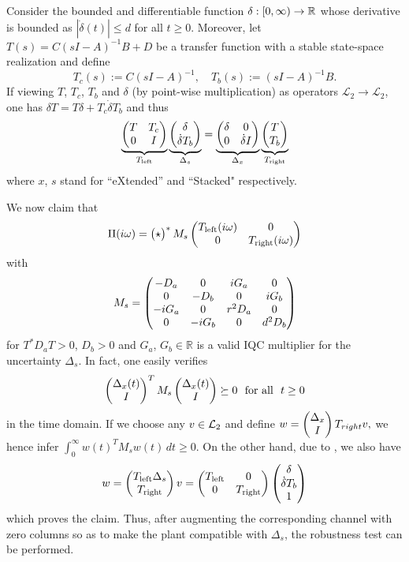 \begin{lem}\label{lem:swap}
Consider the bounded and differentiable function $\delta:[0,\infty)\to\mathbb{R}$ whose derivative is 
bounded as $|\dot{\delta}(t)| \leq d$ for all $t\geq 0$. Moreover, let $T(s) = C(sI-A)^{-1}B+D$ 
be a transfer function with a stable state-space realization and define
\begin{equation*}
T_c(s) :=  C(sI-A)^{-1}, \quad T_b(s) :=  (sI-A)^{-1}B.
\end{equation*}
If viewing $T$, $T_c$, $T_b$ and $\delta$ (by point-wise multiplication) as operators
$\mathcal{L}_2\to \mathcal{L}_2$, one has $\delta T = T\delta  + T_c \dot{\delta} T_b $ and thus
\begin{equation*}
\underbrace{\begin{pmatrix}T &T_c\\0 &I\end{pmatrix}}_{T_{\mathrm{left}}}\underbrace{
\begin{pmatrix}\delta\\ \dot{\delta}T_b\end{pmatrix}}_{\Delta_s} = \underbrace{\begin{pmatrix}\delta &0\\0 & \dot{\delta}I\end{pmatrix}}_{\Delta_x} 
\underbrace{\begin{pmatrix}T\\T_b\end{pmatrix}}_{T_{\mathrm{right}}}
\end{equation*}
where $x$, $s$ stand for ``eXtended'' and ``Stacked" respectively.
\end{lem}
We now claim that
\[
\Pi(i\omega) = \begin{pmatrix}\star\end{pmatrix}^*{M}_s\begin{pmatrix}T_{\mathrm{left}}(i\omega) &0\\0 &T_{\mathrm{right}}(i\omega)\end{pmatrix}
\]
with
\[
{M}_s = \begin{pmatrix}-D_a &0 &iG_a &0\\0 &-D_b&0&iG_b\\ -iG_a &0 &r^2D_a &0\\0 &-iG_b &0 &d^2D_b\end{pmatrix}
\]
for $T^*D_aT > 0$, $D_b>0$ and $G_a$, $G_b\in\mathbb{R}$ is a valid IQC multiplier for the uncertainty $\Delta_s$. In fact,
one easily verifies
\[
\begin{pmatrix}\Delta_x(t)\\I\end{pmatrix}^TM_s\begin{pmatrix}\Delta_x(t)\\I\end{pmatrix} \succeq 0
\text{\ \ for all\ \ }t\geq 0
\]
in the time domain. If we choose any $v\in \mathcal{L}_2$ and define
$w=\begin{pmatrix}\Delta_x\\I\end{pmatrix}T_{right}v,$
we hence infer $\int_0^\infty w(t)^TM_sw(t)\,dt\geq 0$. On the other hand, due to , we also have
$$
w=\begin{pmatrix}T_{\mathrm{left}}\Delta_s\\T_{\mathrm{right}}\end{pmatrix}v=\begin{pmatrix}T_{\mathrm{left}} &0\\0 &T_{\mathrm{right}}\end{pmatrix}
\begin{pmatrix}\delta \\\dot{\delta}T_b\\1\end{pmatrix}
$$
which proves the claim. Thus, after augmenting the corresponding channel with zero columns so as to make 
the plant compatible with $\Delta_s$, the robustness test can be performed.


